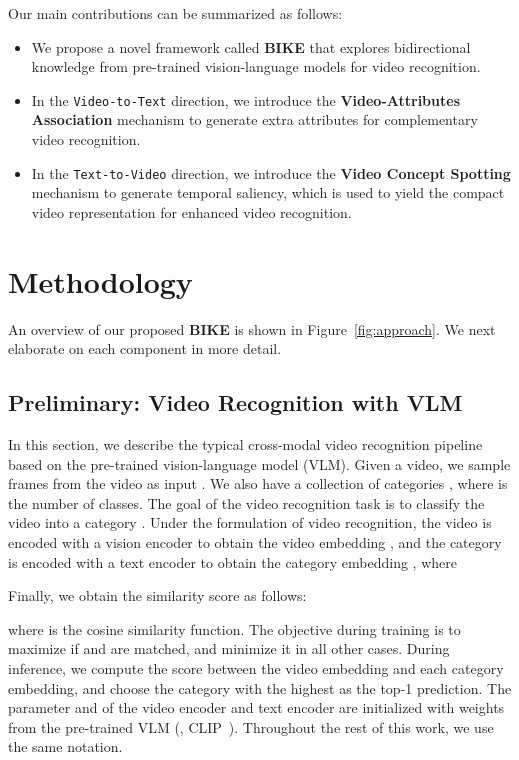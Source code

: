 \documentclass[10pt,twocolumn,letterpaper]{article}
\begin{document}
Our main contributions can be summarized as follows:
\begin{itemize}
    \item We propose a novel framework called \textbf{BIKE} that explores bidirectional knowledge from pre-trained vision-language models for video recognition.
    \item In the \texttt{Video-to-Text} direction, we introduce the \textbf{Video-Attributes Association} mechanism to generate extra attributes for complementary video recognition.
    \item In the \texttt{Text-to-Video} direction, we introduce the \textbf{Video Concept Spotting} mechanism to generate temporal saliency, which is used to yield the compact video representation for enhanced video recognition.
\end{itemize}
 \section{Methodology}



An overview of our proposed \textbf{BIKE} is shown in Figure~\ref{fig:approach}. We next elaborate on each component in more detail.

\subsection{Preliminary: Video Recognition with VLM}
\label{sec:VL}
In this section, we describe the typical cross-modal video recognition pipeline~\cite{wang2021actionclip,ju2022prompting,x-clip,text4vis} based on the pre-trained vision-language model (VLM).
Given a video, we sample  frames from the video as input . 
We also have a collection of categories , where  is the number of classes.
The goal of the video recognition task is to classify the video  into a category .
Under the formulation of video recognition, the video  is encoded with a vision encoder  to obtain the video embedding , and the category  is encoded with a text encoder  to obtain the category embedding , where

Finally, we obtain the similarity score  as follows:

where  is the cosine similarity function. The objective during training is to maximize  if  and  are matched, and minimize it in all other cases. During inference, we compute the score between the video embedding and each category embedding, and choose the category with the highest  as the top-1 prediction.
The parameter  and  of the video encoder and text encoder are initialized with weights from the pre-trained VLM (\eg, CLIP~\cite{CLIP}).
Throughout the rest of this work, we use the same notation.
\end{document}
